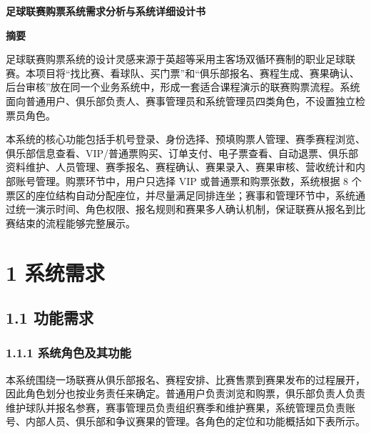 \documentclass[UTF8,zihao=-4,a4paper]{ctexart}
\begin{document}
\begin{center}
{\bfseries\color{titleblue} 足球联赛购票系统需求分析与系统详细设计书}\\[1.5em]
\end{center}

\begin{center}
{\Large\bfseries\color{titleblue} 摘要}
\end{center}

足球联赛购票系统的设计灵感来源于英超等采用主客场双循环赛制的职业足球联赛。本项目将“找比赛、看球队、买门票”和“俱乐部报名、赛程生成、赛果确认、后台审核”放在同一个业务系统中，形成一套适合课程演示的联赛购票流程。系统面向普通用户、俱乐部负责人、赛事管理员和系统管理员四类角色，不设置独立检票员角色。

本系统的核心功能包括手机号登录、身份选择、预填购票人管理、赛季赛程浏览、俱乐部信息查看、VIP/普通票购买、订单支付、电子票查看、自动退票、俱乐部资料维护、人员管理、赛季报名、赛程确认、赛果录入、赛果审核、营收统计和内部账号管理。购票环节中，用户只选择 VIP 或普通票和购票张数，系统根据 8 个票区的座位结构自动分配座位，并尽量满足同排连坐；赛事和管理环节中，系统通过统一演示时间、角色权限、报名规则和赛果多人确认机制，保证联赛从报名到比赛结束的流程能够完整展示。

\newpage
\tableofcontents
\newpage

\section*{1 系统需求}
{}

\subsection*{1.1 功能需求}
{}

\subsubsection*{1.1.1 系统角色及其功能}
{}

本系统围绕一场联赛从俱乐部报名、赛程安排、比赛售票到赛果发布的过程展开，因此角色划分也按业务责任来确定。普通用户负责浏览和购票，俱乐部负责人负责维护球队并报名参赛，赛事管理员负责组织赛季和维护赛果，系统管理员负责账号、内部人员、俱乐部和争议赛果的管理。各角色的定位和功能概括如下表所示。
\end{document}
